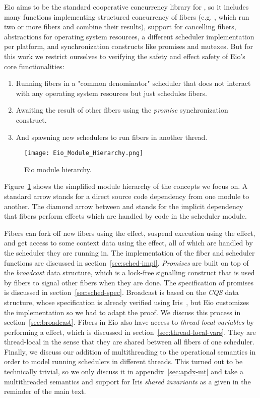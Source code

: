 Eio aims to be the standard cooperative concurrency library for \ocf{},
so it includes many functions implementing structured concurrency of fibers (e.g. , which run two or more fibers and combine their results),
support for cancelling fibers, abstractions for operating system resources,
a different scheduler implementation per platform, and synchronization constructs like promises and mutexes.
But for this work we restrict ourselves to verifying the safety and effect safety of Eio's core functionalities:
\begin{enumerate}
    \item Running fibers in a "common denominator" scheduler that does not interact with any operating system resources but just schedules fibers.
    \item Awaiting the result of other fibers using the \emph{promise} synchronization construct.
    \item And spawning new schedulers to run fibers in another thread.
\end{enumerate}

\begin{figure}[ht]
    \centering
    \texttt{[image: Eio\_Module\_Hierarchy.png]}
    \caption{Eio module hierarchy.}
    \label{fig:eio-module-hierarchy}
\end{figure}

Figure~\ref{fig:eio-module-hierarchy} shows the simplified module hierarchy of the concepts we focus on.
A standard arrow stands for a direct source code dependency from one module to another.
The diamond arrow between  and  stands for the implicit dependency that fibers perform effects which are handled by code in the scheduler module.

Fibers can fork off new fibers using the \efork{} effect, suspend execution using the \esuspend{} effect, and get access to some context data using the \egetctx{} effect,
all of which are handled by the scheduler they are running in.
The implementation of the fiber and scheduler functions are discussed in section~\ref{sec:sched-impl}.
\emph{Promises} are built on top of the \emph{broadcast} data structure, which is a lock-free signalling construct that is used by fibers to signal other fibers when they are done.
The specification of promises is discussed in section~\ref{sec:sched-spec}.
Broadcast is based on the \emph{CQS} data structure, whose specification is already verified using Iris~\cite{koval2023cqs}, but Eio customizes the implementation so we had to adapt the proof.
We discuss this process in section~\ref{sec:broadcast}.
Fibers in Eio also have access to \emph{thread-local variables} by performing a \egetctx{} effect, which is discussed in section~\ref{sec:thread-local-vars}.
They are thread-local in the sense that they are shared between all fibers of one scheduler.
Finally, we discuss our addition of multithreading to the \hazel{} operational semantics in order to model running schedulers in different threads.
This turned out to be technically trivial, so we only discuss it in appendix~\ref{sec:apdx-mt} and take a multithreaded semantics and support for Iris \emph{shared invariants} as a given in the reminder of the main text.

